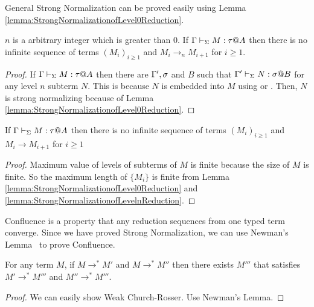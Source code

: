 General Strong Normalization can be proved easily using Lemma
\ref{lemma:StrongNormalizationofLevel0Reduction}.

\begin{lemma}
    \label{lemma:StrongNormalizationofLevelnReduction}
    \( n \) is a arbitrary integer which is greater than 0.
    If \( \G\V M:\tau@A \) then there is no infinite sequence of terms $(M_i)_{i\ge1}$ and $M_i \longrightarrow_n M_{i+1}$ for $i\ge 1$.
\end{lemma}

\begin{proof}
    If \( \G\V M:\tau@A \) then there are \( \Gamma', \sigma \) and \( B \) such
    that \( \Gamma' \vdash_\Sigma N : \sigma @ B \) for any level \( n \) subterm \( N \).
    This is because \( N \) is embedded into \( M \) using \KApp or \TApp.
    Then, \( N \) is strong normalizing because of Lemma
    \ref{lemma:StrongNormalizationofLevel0Reduction}.
\end{proof}

\begin{theorem}
    \label{theorem:StrongNormalization}
    If \( \G\V M:\tau@A \) then there is no infinite sequence of terms $(M_i)_{i\ge1}$ and $M_i \longrightarrow M_{i+1}$ for $i\ge 1$
\end{theorem}

\begin{proof}
    Maximum value of levels of subterms of \( M \) is finite because the size
    of \( M \) is finite. So the maximum length of \( \{ M_i \} \) is finite
    from Lemma \ref{lemma:StrongNormalizationofLevel0Reduction} and
    \ref{lemma:StrongNormalizationofLevelnReduction}.
\end{proof}

Confluence is a property that any reduction sequences from one typed term
converge.  Since we have proved Strong Normalization, we can use Newman's
Lemma~\cite{DBLP:books/daglib/0092409} to prove Confluence.

\begin{theorem}[Confluence]
	For any term $M$, if $M \longrightarrow^* M'$ and $M \longrightarrow^* M''$ then
	there exists $M'''$ that satisfies $M' \longrightarrow^* M'''$ and $M'' \longrightarrow^* M'''$.
\end{theorem}

\begin{proof}
  We can easily show Weak Church-Rosser. Use Newman's Lemma.
\end{proof}


